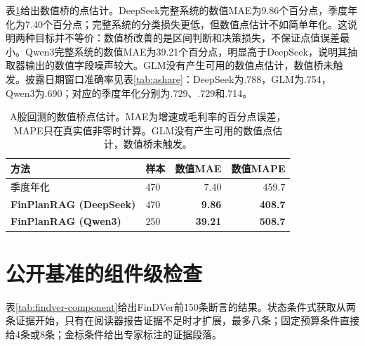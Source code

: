 表\ref{tab:ashare-numeric}给出数值桥的点估计。DeepSeek完整系统的数值MAE为9.86个百分点，季度年化为7.40个百分点；完整系统的分类损失更低，但数值点估计不如简单年化。这说明两种目标并不等价：数值桥改善的是区间判断和决策损失，不保证点值误差最小。Qwen3完整系统的数值MAE为39.21个百分点，明显高于DeepSeek，说明其抽取器输出的数值字段噪声较大。GLM没有产生可用的数值点估计，数值桥未触发。披露日期窗口准确率见表\ref{tab:ashare}：DeepSeek为.788，GLM为.754，Qwen3为.690；对应的季度年化分别为.729、.729和.714。

\begin{table}[htbp]
\centering
{}
\setlength{\tabcolsep}{4pt}
\caption{A股回测的数值桥点估计。MAE为增速或毛利率的百分点误差，MAPE只在真实值非零时计算。GLM没有产生可用的数值点估计，数值桥未触发。}
\label{tab:ashare-numeric}
\begin{tabular}{llrr}
\toprule
方法 & 样本 & 数值MAE & 数值MAPE \\
\midrule
季度年化 & 470 & 7.40 & 459.7 \\
\textbf{FinPlanRAG (DeepSeek)} & 470 & \textbf{9.86} & \textbf{408.7} \\
\textbf{FinPlanRAG (Qwen3)} & 250 & \textbf{39.21} & \textbf{508.7} \\
\bottomrule
\end{tabular}
\end{table}

\section{公开基准的组件级检查}

表\ref{tab:findver-component}给出FinDVer前150条断言的结果。状态条件式获取从两条证据开始，只有在阅读器报告证据不足时才扩展，最多八条；固定预算条件直接给4条或8条；金标条件给出专家标注的证据段落。

